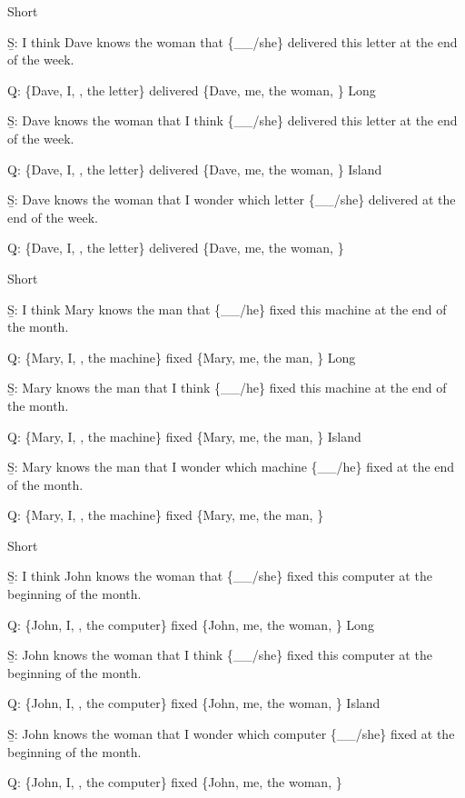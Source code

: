 \pex 
\a Short\par\nobreak
\beginsubsub 
\b{S:} I think Dave knows the woman that \{\_\_/she\} delivered this letter at the end of the week.\par\nobreak
\b{Q:} \{Dave, I, , the letter\} delivered \{Dave, me, the woman, \}
\endsubsub
\a Long\par\nobreak
\beginsubsub
\b{S:} Dave knows the woman that I think \{\_\_/she\} delivered this letter at the end of the week.\par\nobreak
\b{Q:} \{Dave, I, , the letter\} delivered \{Dave, me, the woman, \}
\endsubsub
\a Island\par\nobreak
\beginsubsub
\b{S:} Dave knows the woman that I wonder which letter \{\_\_/she\} delivered at the end of the week.\par\nobreak
\b{Q:} \{Dave, I, , the letter\} delivered \{Dave, me, the woman, \}
\endsubsub
\xe

\pex 
\a Short\par\nobreak
\beginsubsub 
\b{S:} I think Mary knows the man that \{\_\_/he\} fixed this machine at the end of the month.\par\nobreak
\b{Q:} \{Mary, I, , the machine\} fixed \{Mary, me, the man, \}
\endsubsub
\a Long\par\nobreak
\beginsubsub
\b{S:} Mary knows the man that I think \{\_\_/he\} fixed this machine at the end of the month.\par\nobreak
\b{Q:} \{Mary, I, , the machine\} fixed \{Mary, me, the man, \}
\endsubsub
\a Island\par\nobreak
\beginsubsub
\b{S:} Mary knows the man that I wonder which machine \{\_\_/he\} fixed at the end of the month.\par\nobreak
\b{Q:} \{Mary, I, , the machine\} fixed \{Mary, me, the man, \}
\endsubsub
\xe

\pex 
\a Short\par\nobreak
\beginsubsub 
\b{S:} I think John knows the woman that \{\_\_/she\} fixed this computer at the beginning of the month.\par\nobreak
\b{Q:} \{John, I, , the computer\} fixed \{John, me, the woman, \}
\endsubsub
\a Long\par\nobreak
\beginsubsub
\b{S:} John knows the woman that I think \{\_\_/she\} fixed this computer at the beginning of the month.\par\nobreak
\b{Q:} \{John, I, , the computer\} fixed \{John, me, the woman, \}
\endsubsub
\a Island\par\nobreak
\beginsubsub
\b{S:} John knows the woman that I wonder which computer \{\_\_/she\} fixed at the beginning of the month.\par\nobreak
\b{Q:} \{John, I, , the computer\} fixed \{John, me, the woman, \}
\endsubsub
\xe


